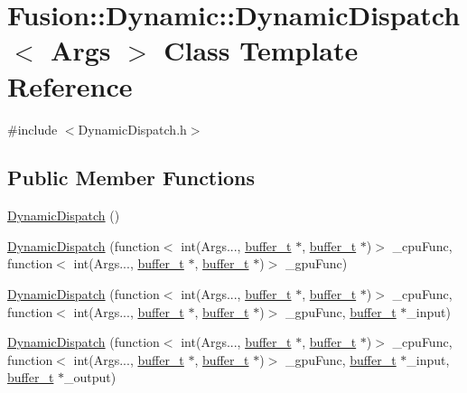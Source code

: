 \hypertarget{class_fusion_1_1_dynamic_1_1_dynamic_dispatch}{\section{Fusion\-:\-:Dynamic\-:\-:Dynamic\-Dispatch$<$ Args $>$ Class Template Reference}
\label{class_fusion_1_1_dynamic_1_1_dynamic_dispatch}
}


{\ttfamily \#include $<$Dynamic\-Dispatch.\-h$>$}

\subsection*{Public Member Functions}
\begin{DoxyCompactItemize}
\item 
\hyperlink{class_fusion_1_1_dynamic_1_1_dynamic_dispatch_ad7f22c9e07d69a934a9f0c0adc1e256c}{Dynamic\-Dispatch} ()
\item 
\hyperlink{class_fusion_1_1_dynamic_1_1_dynamic_dispatch_a76a96462319d863ab9cc138f341cb43b}{Dynamic\-Dispatch} (function$<$ int(Args..., \hyperlink{structbuffer__t}{buffer\-\_\-t} $\ast$, \hyperlink{structbuffer__t}{buffer\-\_\-t} $\ast$)$>$ \-\_\-cpu\-Func, function$<$ int(Args..., \hyperlink{structbuffer__t}{buffer\-\_\-t} $\ast$, \hyperlink{structbuffer__t}{buffer\-\_\-t} $\ast$)$>$ \-\_\-gpu\-Func)
\item 
\hyperlink{class_fusion_1_1_dynamic_1_1_dynamic_dispatch_ad8465d30baed11928f7ec89aa7059622}{Dynamic\-Dispatch} (function$<$ int(Args..., \hyperlink{structbuffer__t}{buffer\-\_\-t} $\ast$, \hyperlink{structbuffer__t}{buffer\-\_\-t} $\ast$)$>$ \-\_\-cpu\-Func, function$<$ int(Args..., \hyperlink{structbuffer__t}{buffer\-\_\-t} $\ast$, \hyperlink{structbuffer__t}{buffer\-\_\-t} $\ast$)$>$ \-\_\-gpu\-Func, \hyperlink{structbuffer__t}{buffer\-\_\-t} $\ast$\-\_\-input)
\item 
\hyperlink{class_fusion_1_1_dynamic_1_1_dynamic_dispatch_aa13c90fe52064be5caa254f86a56d93f}{Dynamic\-Dispatch} (function$<$ int(Args..., \hyperlink{structbuffer__t}{buffer\-\_\-t} $\ast$, \hyperlink{structbuffer__t}{buffer\-\_\-t} $\ast$)$>$ \-\_\-cpu\-Func, function$<$ int(Args..., \hyperlink{structbuffer__t}{buffer\-\_\-t} $\ast$, \hyperlink{structbuffer__t}{buffer\-\_\-t} $\ast$)$>$ \-\_\-gpu\-Func, \hyperlink{structbuffer__t}{buffer\-\_\-t} $\ast$\-\_\-input, \hyperlink{structbuffer__t}{buffer\-\_\-t} $\ast$\-\_\-output)
\item 

\end{DoxyCompactItemize}
